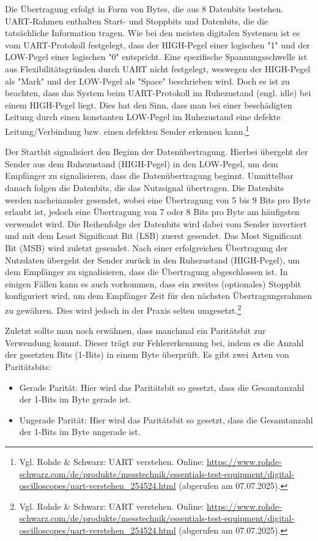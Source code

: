 Die Übertragung erfolgt in Form von Bytes, die aus 8 Datenbits bestehen. UART-Rahmen enthalten Start- und Stoppbits und Datenbits, die die tatsächliche Information tragen. Wie bei den meisten digitalen Systemen ist es vom UART-Protokoll festgelegt, dass der HIGH-Pegel einer logischen "1" und der LOW-Pegel einer logischen "0" entspricht. Eine spezifische Spannungsschwelle ist aus Flexibilitätsgründen durch UART nicht festgelegt, weswegen der HIGH-Pegel als "Mark" und der LOW-Pegel als "Space" beschrieben wird. Doch es ist zu beachten, dass das System beim UART-Protokoll im Ruhezustand (engl. idle) bei einem HIGH-Pegel liegt. Dies hat den Sinn, dass man bei einer beschädigten Leitung durch einen konstanten LOW-Pegel im Ruhezustand eine defekte Leitung/Verbindung bzw. einen defekten Sender erkennen kann.\footnote{Vgl. Rohde \& Schwarz: UART verstehen. Online: \url{https://www.rohde-schwarz.com/de/produkte/messtechnik/essentials-test-equipment/digital-oscilloscopes/uart-verstehen_254524.html} (abgerufen am 07.07.2025).}

Der Startbit signalisiert den Beginn der Datenübertragung. Hierbei übergeht der Sender aus dem Ruhezustand (HIGH-Pegel) in den LOW-Pegel, um dem Empfänger zu signalisieren, dass die Datenübertragung beginnt. 
Unmittelbar danach folgen die Datenbits, die das Nutzsignal übertragen. Die Datenbits werden nacheinander gesendet, wobei eine Übertragung von 5 bis 9 Bits pro Byte erlaubt ist, jedoch eine Übertragung von 7 oder 8 Bits pro Byte am häufigsten verwendet wird. Die Reihenfolge der Datenbits wird dabei vom Sender invertiert und mit dem Least Significant Bit (LSB) zuerst gesendet. Das Most Significant Bit (MSB) wird zuletzt gesendet.
Nach einer erfolgreichen Übertragung der Nutzdaten übergeht der Sender zurück in den Ruhezustand (HIGH-Pegel), um dem Empfänger zu signalisieren, dass die Übertragung abgeschlossen ist.
In einigen Fällen kann es auch vorkommen, dass ein zweites (optionales) Stoppbit konfiguriert wird, um dem Empfänger Zeit für den nächsten Übertragungsrahmen zu gewähren. Dies wird jedoch in der Praxis selten umgesetzt.\footnote{Vgl. Rohde \& Schwarz: UART verstehen. Online: \url{https://www.rohde-schwarz.com/de/produkte/messtechnik/essentials-test-equipment/digital-oscilloscopes/uart-verstehen_254524.html} (abgerufen am 07.07.2025).}

Zuletzt sollte man noch erwähnen, dass manchmal ein Paritätsbit zur Verwendung kommt. Dieser trägt zur Fehlererkennung bei, indem es die Anzahl der gesetzten Bits (1-Bits) in einem Byte überprüft. Es gibt zwei Arten von Paritätsbits: 
\begin{itemize}
    \item Gerade Parität: Hier wird das Paritätsbit so gesetzt, dass die Gesamtanzahl der 1-Bits im Byte gerade ist.
    \item Ungerade Parität: Hier wird das Paritätsbit so gesetzt, dass die Gesamtanzahl der 1-Bits im Byte ungerade ist.
\end{itemize}

